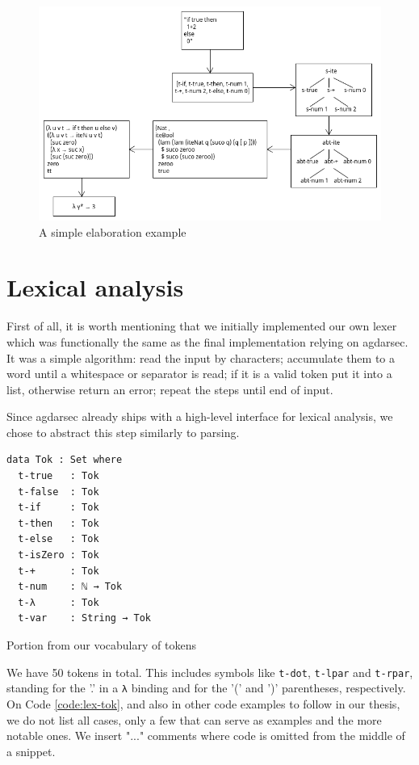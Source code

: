 \begin{figure}[h!]
	\centering
	\includegraphics[width=1.0\textwidth]{../images/example-1.png}
	\caption{A simple elaboration example}
	\label{fig:example-1}
\end{figure}

\section{Lexical analysis} \label{sec:lexer}

First of all, it is worth mentioning that we initially implemented our own lexer which was functionally the same as the final implementation relying on agdarsec. It was a simple algorithm: read the input by characters; accumulate them to a word until a whitespace or separator is read; if it is a valid token put it into a list, otherwise return an error; repeat the steps until end of input.

Since agdarsec already ships with a high-level interface for lexical analysis, we chose to abstract this step similarly to parsing.

\begin{listing}[H]
\begin{verbatim}
data Tok : Set where
  t-true   : Tok
  t-false  : Tok
  t-if     : Tok
  t-then   : Tok
  t-else   : Tok
  t-isZero : Tok
  t-+      : Tok
  t-num    : ℕ → Tok
  t-λ      : Tok
  t-var    : String → Tok
\end{verbatim}
\caption{Portion from our vocabulary of tokens}
\label{code:lex-tok}
\end{listing}

We have 50 tokens in total. This includes symbols like \verb$t-dot$, \verb$t-lpar$ and \verb$t-rpar$, standing for the '.' in a \verb$λ$ binding and for the '(' and ')' parentheses, respectively. On Code \ref{code:lex-tok}, and also in other code examples to follow in our thesis, we do not list all cases, only a few that can serve as examples and the more notable ones. We insert "..." comments where code is omitted from the middle of a snippet.

